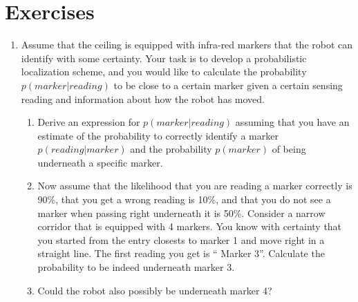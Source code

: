 \section*{Exercises}\small
\begin{enumerate}
\item Assume that the ceiling is equipped with infra-red markers that the robot can identify with some certainty. Your task is to develop a probabilistic localization scheme, and you would like to calculate the probability $p(marker|reading)$ to be close to a certain marker given a certain sensing reading and information about how the robot has moved.
\begin{enumerate}
\item Derive an expression for $p(marker|reading)$ assuming that you have an estimate of the probability to correctly identify a marker $p(reading|marker)$ and the probability $p(marker)$ of being underneath a specific marker. 
\item Now assume that the likelihood that you are reading a marker correctly is 90\%, that you get a wrong reading is 10\%, and that you do not see a marker when passing right underneath it is 50\%. Consider a narrow corridor that is equipped with 4 markers. You know with certainty that you started from the entry closests to marker 1 and move right in a straight line. The first reading you get is `` Marker 3''. Calculate the probability to be indeed underneath marker 3.
\item Could the robot also possibly be underneath marker 4?
\end{enumerate}
\end{enumerate}\normalsize